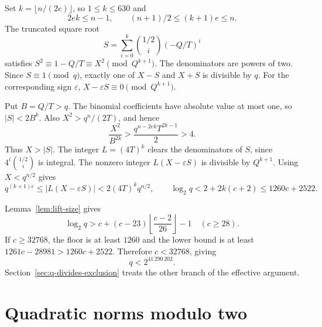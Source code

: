 \documentclass[11pt]{article}
\begin{document}
Set $k=\lfloor n/(2e)\rfloor$, so $1\le k\le630$ and
\[
2ek\le n-1,\qquad (n+1)/2\le (k+1)e\le n.
\]
The truncated square root
\[
S=\sum_{i=0}^{k}\binom{1/2}{i}(-Q/T)^i
\]
satisfies $S^2\equiv1-Q/T\equiv X^2\pmod{Q^{k+1}}$. The
denominators are powers of two. Since $S\equiv1\pmod q$, exactly
one of $X-S$ and $X+S$ is divisible by $q$. For the corresponding
sign $\varepsilon$, $X-\varepsilon S\equiv0\pmod{Q^{k+1}}$.

Put $B=Q/T>q$. The binomial coefficients have absolute value at
most one, so $|S|<2B^k$. Also $X^2>q^n/(2T)$, and hence
\[
\frac{X^2}{B^{2k}}
>\frac{q^{n-2ek}T^{2k-1}}2>4.
\]
Thus $X>|S|$. The integer $L=(4T)^k$ clears the denominators of $S$,
since $4^i\binom{1/2}{i}$ is integral. The nonzero integer
$L(X-\varepsilon S)$ is divisible by $Q^{k+1}$. Using $X<q^{n/2}$
gives
\[
q^{(k+1)e}\le |L(X-\varepsilon S)|<2(4T)^kq^{n/2},
\qquad
\log_2 q<2+2k(c+2)\le1260c+2522.
\]

Lemma~\ref{lem:lift-size} gives
\[
\log_2 q>c+(c-23)\left\lfloor\frac{c-2}{26}\right\rfloor-1
\quad(c\ge28).
\]
If $c\ge32768$, the floor is at least $1260$ and the lower bound
is at least $1261c-28981>1260c+2522$. Therefore $c<32768$, giving
\[
\boxed{q<2^{41\,290\,202}.}
\]
Section~\ref{sec:q-divides-exclusion} treats the other branch of the
effective argument.

\section{Quadratic norms modulo two}
\label{sec:quadratic-norm}
\end{document}
